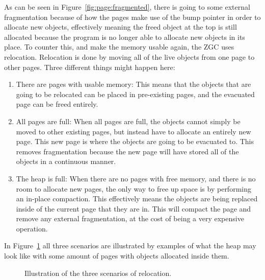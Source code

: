 As can be seen in Figure~\ref{fig:page:fragmented}, there is going to some external fragmentation because of how the pages make use of the bump pointer in order to allocate new objects, effectively meaning the freed object at the top is still allocated because the program is no longer able to allocate new objects in its place. To counter this, and make the memory usable again, the ZGC uses relocation. Relocation is done by moving all of the live objects from one page to other pages. Three different things might happen here:\\
\begin{enumerate}
    \item There are pages with usable memory: This means that the objects that are going to be relocated can be placed in pre-existing pages, and the evacuated page can be freed entirely. 
    \item All pages are full: When all pages are full, the objects cannot simply be moved to other existing pages, but instead have to allocate an entirely new page. This new page is where the objects are going to be evacuated to. This removes fragmentation because the new page will have stored all of the objects in a continuous manner.
    \item The heap is full: When there are no pages with free memory, and there is no room to allocate new pages, the only way to free up space is by performing an in-place compaction. This effectively means the objects are being replaced inside of the current page that they are in. This will compact the page and remove any external fragmentation, at the cost of being a very expensive operation.
\end{enumerate}

In Figure~\ref{fig:relocation_scenarios} all three scenarios are illustrated by examples of what the heap may look like with some amount of pages with objects allocated inside them.

\begin{figure}
    \centering
    
    \caption{Illustration of the three scenarios of relocation.}
    \label{fig:relocation_scenarios}
\end{figure}
